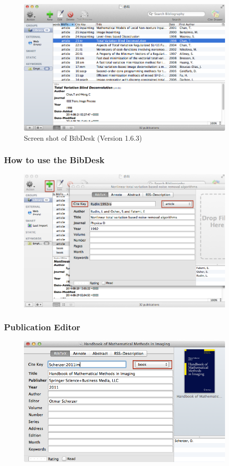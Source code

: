 \documentclass[notheorems,mathserif,table,compress,dvipsnames]{beamer}  %
\begin{document}
%
\begin{frame}
\frametitle{}
\begin{figure}[!ht]
\includegraphics[width=4.2in]{bibdesk1}
\caption{Screen shot of BibDesk (Version 1.6.3)}
\end{figure} 
\end{frame}

%
\begin{frame}
\frametitle{How to use the BibDesk}
\begin{figure}[!ht]
\includegraphics[width=4.2in]{bibdesk2}
\end{figure} 
\end{frame}

%
\begin{frame}
\frametitle{Publication Editor}
\begin{figure}[!ht]
\includegraphics[width=4.2in]{bibdesk3}
\end{figure} 
\end{frame}
\end{document}
